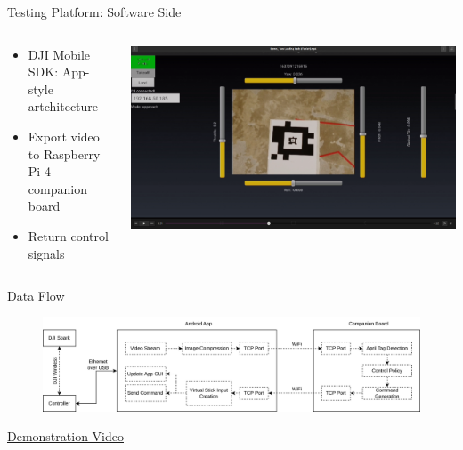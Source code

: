 \documentclass[aspectratio=169]{beamer}
\begin{document}
\begin{frame}{Testing Platform: Software Side}
	\begin{columns}
	\begin{column}{0.5\textwidth}
	\begin{itemize}
		\item DJI Mobile SDK: App-style artchitecture
		\item Export video to Raspberry Pi 4 companion board
		\item Return control signals
	\end{itemize}
	\end{column}
	\begin{column}{0.5\textwidth}
		\centering
		\includegraphics[width=\textwidth]{./images/tablet_screenshot}
	\end{column}
	\end{columns}
\end{frame}

\begin{frame}{Data Flow}
	\begin{figure}
		\centering
		\includegraphics[width=\textwidth]{./images/spark_architecture.drawio}
	\end{figure}
	\href{run:./autonomous_landing_demonstration_short.mp4}{Demonstration Video}
\end{frame}
\end{document}
